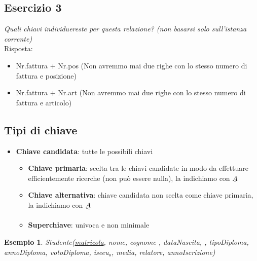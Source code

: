 \documentclass[12pt]{article}
\newtheorem{example}{Esempio}
\begin{document}
\subsection{Esercizio 3}
\begin{center}
\end{center}
\textit{Quali chiavi individuereste per questa relazione? (non basarsi solo sull'istanza corrente)}\\
Risposta:
\begin{itemize}
    \setlength\itemsep{0em} 
    \item Nr.fattura + Nr.pos (Non avremmo mai due righe con lo stesso numero di fattura e posizione)
    \item Nr.fattura + Nr.art (Non avremmo mai due righe con lo stesso numero di fattura e articolo)
\end{itemize}
\subsection{Tipi di chiave}
\begin{itemize}
    \setlength\itemsep{0em} 
    \item \textbf{Chiave candidata}: tutte le possibili chiavi
    \begin{itemize}
        \item \textbf{Chiave primaria}: scelta tra le chiavi candidate in modo da effettuare efficientemente ricerche (non può essere nulla), la indichiamo con \(\underline{A}\)
        \item \textbf{Chiave alternativa}: chiave candidata non scelta come chiave primaria, la indichiamo con \(\uwave{A}\)
        \item \textbf{Superchiave}: univoca e non minimale
    \end{itemize}
\end{itemize}
\begin{example}
    Studente(\uline{matricola}, nome, cognome , dataNascita, , tipoDiploma, annoDiploma, votoDiploma, iseeu\(_{o}\), media, relatore, annoIscrizione)
\end{example}
\end{document}
